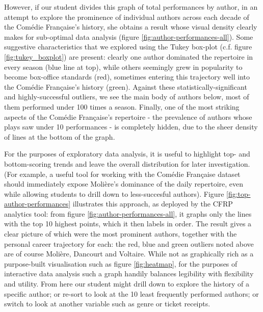 \documentclass[	DIV=calc,%
							paper=a4,%
							fontsize=11pt,%
							twocolumn]{scrartcl}	 					%
\begin{document}
However, if our student divides this graph of total performances by author, in an attempt to explore the prominence of individual authors across each decade of the Comédie Française's history, she obtains a result whose visual density clearly makes for sub-optimal data analysis (figure \ref{fig:author-performances-all}).  Some suggestive characteristics that we explored using the Tukey box-plot (c.f. figure \ref{fig:tukey_boxplot}) are  present: clearly one author dominated the repertoire in every season (blue line at top), while others seemingly grew in popularity to become box-office standards (red), sometimes entering this trajectory well into the Comédie Française's history (green).  Against these statistically-significant and highly-successful outliers, we see the main body of authors below, most of them performed under 100 times a season.  Finally, one of the most striking aspects of the Comédie Française's repertoire - the prevalence of authors whose plays saw under 10 performances - is completely hidden, due to the sheer density of lines at the bottom of the graph.

For the purposes of exploratory data analysis, it is useful to highlight top- and bottom-scoring trends and leave the overall distribution for later investigation.  (For example, a useful tool for working with the Comédie Française dataset should immediately expose Molière's dominance of the daily repertoire, even while allowing students to drill down to less-succesful authors).  Figure \ref{fig:top-author-performances} illustrates this approach, as deployed by the CFRP analytics tool: from figure \ref{fig:author-performances-all}, it graphs only the lines with the top 10 highest points, which it then labels in order.  The result gives a clear picture of which were the most prominent authors, together with the personal career trajectory for each: the red, blue and green outliers noted above are of course Molière, Dancourt and Voltaire.  While not as graphically rich as a purpose-built visualisation such as figure \ref{fig:heatmap}, for the purposes of interactive data analysis such a graph handily balances legibility with flexibility and utility.  From here our student might drill down to explore the history of a specific author; or re-sort to look at the 10 least frequently performed authors; or switch to look at another variable such as genre or ticket receipts.
\end{document}
